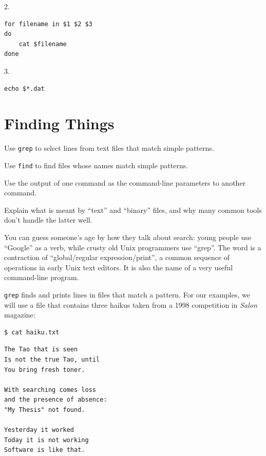 \documentclass{book}
\begin{document}
2.

\begin{verbatim}
for filename in $1 $2 $3
do
    cat $filename
done
\end{verbatim}

3.

\begin{verbatim}
echo $*.dat
\end{verbatim}

\section{Finding Things}

\begin{objectives}
\begin{swcitemize}
\item
  Use \texttt{grep} to select lines from text files that match simple
  patterns.
\item
  Use \texttt{find} to find files whose names match simple patterns.
\item
  Use the output of one command as the command-line parameters to
  another command.
\item
  Explain what is meant by ``text'' and ``binary'' files, and why many
  common tools don't handle the latter well.
\end{swcitemize}
\end{objectives}

You can guess someone's age by how they talk about search: young people
use ``Google'' as a verb, while crusty old Unix programmers use
``grep''. The word is a contraction of ``global/regular
expression/print'', a common sequence of operations in early Unix text
editors. It is also the name of a very useful command-line program.

\texttt{grep} finds and prints lines in files that match a pattern. For
our examples, we will use a file that contains three haikus taken from a
1998 competition in \emph{Salon} magazine:

\begin{verbatim}
$ cat haiku.txt
\end{verbatim}

\begin{verbatim}
The Tao that is seen
Is not the true Tao, until
You bring fresh toner.

With searching comes loss
and the presence of absence:
"My Thesis" not found.

Yesterday it worked
Today it is not working
Software is like that.
\end{verbatim}
\end{document}
